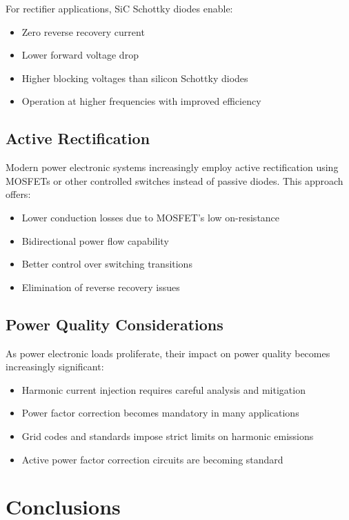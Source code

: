\documentclass[12pt,a4paper]{article}
\begin{document}
For rectifier applications, SiC Schottky diodes enable:
\begin{itemize}
    \item Zero reverse recovery current
    \item Lower forward voltage drop
    \item Higher blocking voltages than silicon Schottky diodes
    \item Operation at higher frequencies with improved efficiency
\end{itemize}

\subsection{Active Rectification}

Modern power electronic systems increasingly employ active rectification using MOSFETs or other controlled switches instead of passive diodes. This approach offers:

\begin{itemize}
    \item Lower conduction losses due to MOSFET's low on-resistance
    \item Bidirectional power flow capability
    \item Better control over switching transitions
    \item Elimination of reverse recovery issues
\end{itemize}

\subsection{Power Quality Considerations}

As power electronic loads proliferate, their impact on power quality becomes increasingly significant:

\begin{itemize}
    \item Harmonic current injection requires careful analysis and mitigation
    \item Power factor correction becomes mandatory in many applications
    \item Grid codes and standards impose strict limits on harmonic emissions
    \item Active power factor correction circuits are becoming standard
\end{itemize}

\section{Conclusions}
\end{document}
